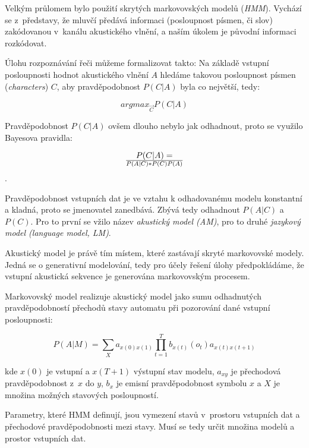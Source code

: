Velkým průlomem bylo použití skrytých
markovovských modelů (\textit{HMM}). Vychází se z~představy, že mluvčí předává
informaci (posloupnost písmen, či slov) zakódovanou v~kanálu akustického vlnění,
a naším úkolem je původní informaci rozkódovat.

Úlohu rozpoznávání řeči můžeme formalizovat takto: Na základě vstupní
posloupnosti hodnot akustického vlnění $A$ hledáme takovou posloupnost písmen
(\textit{characters}) $C$, aby pravděpodobnost $P(C|A)$ byla co největší, tedy:

\begin{equation}
argmax_{\vec{C}} P(C|A)
\end{equation}

Pravděpodobnost $P(C|A)$ ovšem dlouho nebylo jak odhadnout, proto se využilo
Bayesova pravidla:

\begin{equation}
P(C|A) = \over{P(A|C)*P(C)}{P(A)}
\end{equation}.

Pravděpodobnost vstupních dat je ve vztahu k odhadovanému modelu konstantní a
kladná, proto se jmenovatel zanedbává. Zbývá tedy odhadnout $P(A|C)$ a $P(C)$.
Pro to první se vžilo název \textit{akustický model (AM)}, pro to druhé
\textit{jazykový model (language model, LM)}.

Akustický model je právě tím místem, které zastávají skryté markovovské modely.
Jedná se o generativní modelování, tedy pro účely řešení úlohy předpokládáme, že
vstupní akustická sekvence je generována markovovským procesem.

Markovovský model realizuje akustický model jako sumu odhadnutých
pravděpodobností přechodů stavy automatu při pozorování dané vstupní
posloupnosti:

\begin{equation}
P(A|M) = \sum_X a_{x(0)x(1)} \prod_{t=1}^T b_{x(t)}(o_t)a_{x(t)x(t+1)}
\end{equation}

kde $x(0)$ je vstupní a $x(T + 1)$ výstupní stav modelu, $a_{xy}$ je přechodová
pravděpodobnost z~$x$ do $y$, $b_{x}$ je emisní pravděpodobnost symbolu $x$ a
$X$ je množina možných stavových posloupností.

Parametry, které HMM definují, jsou vymezení stavů v~prostoru vstupních dat a
přechodové pravděpodobnosti mezi stavy. Musí se tedy určit množina modelů a
prostor vstupních dat.


